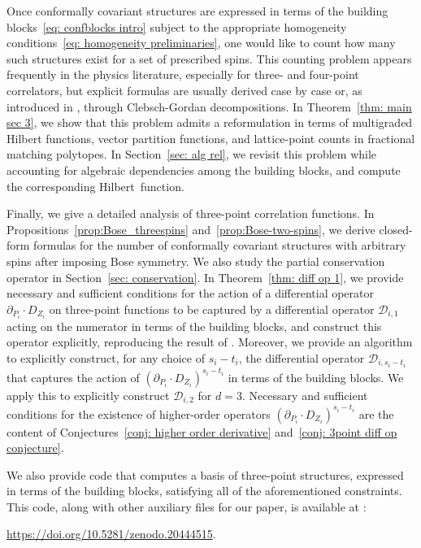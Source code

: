 \documentclass[12pt,a4paper]{extarticle}
\theoremstyle{definition}
\begin{document}
Once conformally covariant structures are expressed in terms of the building blocks~\eqref{eq: confblocks intro} subject to the appropriate homogeneity conditions~\eqref{eq: homogeneity preliminaries}, one would like to count how many such structures exist for a set of prescribed spins. This counting problem appears frequently in the physics literature, especially for three- and four-point correlators, but explicit formulas are usually derived case by case or, as introduced in \cite{KSD}, through Clebsch-Gordan decompositions. In Theorem~\ref{thm: main sec 3}, we show that this problem admits a reformulation in terms of multigraded Hilbert functions, vector partition functions, and lattice-point counts in fractional matching polytopes. In Section~\ref{sec: alg rel}, we revisit this problem while accounting for algebraic dependencies among the building blocks, and compute the corresponding Hilbert~function.

\medskip

Finally, we give a detailed analysis of three-point correlation functions. In Propositions~\ref{prop:Bose_threespins} and~\ref{prop:Bose-two-spins}, we derive closed-form formulas for the number of conformally covariant structures with arbitrary spins after imposing Bose symmetry. We also study the partial conservation ope\-rator in Section~\ref{sec: conservation}. In Theorem~\ref{thm: diff op 1}, we provide necessary and sufficient conditions for the action of a differential operator $\partial_{P_i}\cdot D_{Z_i}$ on three-point functions to be captured by a differential operator $\mathcal{D}_{i,1}$ acting on the numerator in terms of the building blocks, and construct this operator explicitly, reproducing the result of \cite{Zhiboedov}. Moreover, we provide an algorithm to explicitly construct, for any choice of $s_i-t_i$, the differential operator $\mathcal{D}_{i,s_i-t_i}$ that captures the action of $(\partial_{P_i}\cdot D_{Z_i})^{s_i-t_i}$ in terms of the building blocks. We apply this to explicitly construct $\mathcal{D}_{i,2}$ for $d=3$. Necessary and sufficient conditions for the existence of higher-order operators $(\partial_{P_i}\cdot D_{Z_i})^{s_i-t_i}$ are the content of Conjectures~\ref{conj: higher order derivative} and~\ref{conj: 3point diff op conjecture}.

\medskip

We also provide code that computes a basis of three-point structures, expressed in terms of the building blocks, satisfying all of the aforementioned constraints. This code, along with other auxiliary files for our paper, is available at \cite{zenodo}:
\begin{center}
    \url{https://doi.org/10.5281/zenodo.20444515}.
\end{center}
\end{document}
